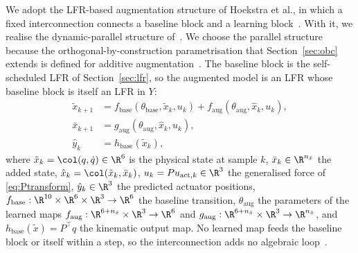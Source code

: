We adopt the LFR-based augmentation structure of Hoekstra et al., in which a
fixed interconnection connects a baseline block and a learning
block~\cite[Sec.~3.2]{hoekstra2025lfr}.
With it, we realise the dynamic-parallel structure
of~\cite[Table~1]{hoekstra2026lfr}.
We choose the parallel structure because the orthogonal-by-construction
parametrisation that Section~\ref{sec:obc} extends is defined for additive
augmentation~\cite[Abstract]{gyorok2026obc}.
The baseline block is the self-scheduled LFR of Section~\ref{sec:lfr}, so the
augmented model is an LFR whose baseline block is itself an LFR in $Y$:
\begin{equation}
\begin{aligned}
 \tilde x_{k+1}
 &=f_{\mathrm{base}}(\theta_{\mathrm{base}},\tilde x_k,u_k)
   +f_{\mathrm{aug}}(\theta_{\mathrm{aug}},\hat x_k,u_k),\\
 \bar x_{k+1}
 &=g_{\mathrm{aug}}(\theta_{\mathrm{aug}},\hat x_k,u_k),\\
 \hat y_k&=h_{\mathrm{base}}(\tilde x_k),
\end{aligned}
\label{eq:aug_transition}
\end{equation}
where $\tilde x_k=\col(q,\dot q)\in\R^6$ is the physical state at sample $k$,
$\bar x_k\in\R^{n_{\bar x}}$ the added state,
$\hat x_k=\col(\tilde x_k,\bar x_k)$, $u_k=Pu_{\mathrm{act},k}\in\R^3$ the
generalised force of \eqref{eq:Ptransform}, $\hat y_k\in\R^3$ the predicted
actuator positions, $f_{\mathrm{base}}:\R^{10}\times\R^6\times\R^3\to\R^6$ the
baseline transition, $\theta_{\mathrm{aug}}$ the parameters of the learned maps
$f_{\mathrm{aug}}:\R^{6+n_{\bar x}}\times\R^3\to\R^6$ and
$g_{\mathrm{aug}}:\R^{6+n_{\bar x}}\times\R^3\to\R^{n_{\bar x}}$, and
$h_{\mathrm{base}}(\tilde x)=P^\top q$ the kinematic output map.
No learned map feeds the baseline block or itself within a step, so the
interconnection adds no algebraic loop~\cite[Thm.~1]{hoekstra2025lfr}.

